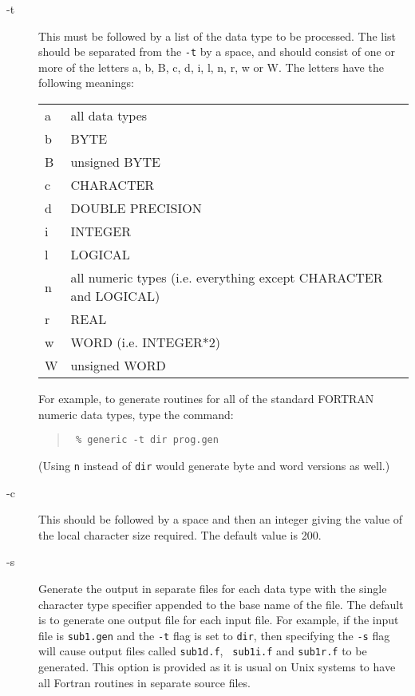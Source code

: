 \begin{description}
\item[-t] This must be followed by a list of the data type to be processed. The
list should be separated from the {\tt -t} by a space, and should consist of
one or more of the letters a, b, B, c, d, i, l, n, r, w or W. The letters have
the following meanings:
\begin{center}
\begin{tabular}{ll}
a & all data types \\
b & BYTE \\
B & unsigned BYTE \\
c & CHARACTER \\
d & DOUBLE PRECISION \\
i & INTEGER \\
l & LOGICAL \\
n & all numeric types (i.e. everything except CHARACTER and LOGICAL)\\
r & REAL \\
w & WORD (i.e. INTEGER*2) \\
W & unsigned WORD \\
\end{tabular}
\end{center}

For example, to generate routines for all of the standard FORTRAN numeric data
types, type the command:

\begin{quote}{\tt
\% generic -t dir prog.gen
}
\end{quote}

(Using {\tt n} instead of {\tt dir} would generate byte and word versions as
well.)

\item[-c] This should be followed by a space and then an integer giving the
value of the local character size required. The default value is 200.

\item[-s] Generate the output in separate files for each data type with the
single character type specifier appended to the base name of the file. The
default is to generate one output file for each input file. For example, if the
input file is {\tt sub1.gen} and the {\tt -t} flag is set to {\tt dir}, then
specifying the {\tt -s} flag will cause output files called {\tt sub1d.f}, {\tt
sub1i.f} and {\tt sub1r.f} to be generated. This option is provided as it is
usual on Unix systems to have all Fortran routines in separate source files.


\end{description}
